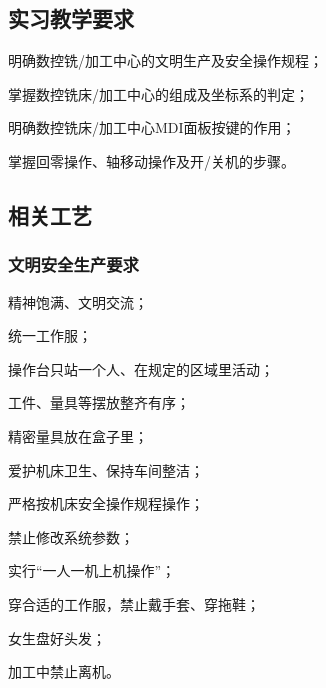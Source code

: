 \jxhj{%
}

\makeshouye%

\subsection{实习教学要求}
\begin{compactenum}[1、]
\item 明确数控铣/加工中心的文明生产及安全操作规程；
\item 掌握数控铣床/加工中心的组成及坐标系的判定；
\item 明确数控铣床/加工中心MDI面板按键的作用；
\item 掌握回零操作、轴移动操作及开/关机的步骤。
\end{compactenum}

\subsection{相关工艺}
\subsubsection{文明安全生产要求}
\begin{compactenum}[1、]
\item 精神饱满、文明交流；
\item 统一工作服；
\item 操作台只站一个人、在规定的区域里活动；
\item 工件、量具等摆放整齐有序；
\item 精密量具放在盒子里；
\item 爱护机床卫生、保持车间整洁；
\item 严格按机床安全操作规程操作；
\item 禁止修改系统参数；
\item 实行“一人一机上机操作”；
\item 穿合适的工作服，禁止戴手套、穿拖鞋；
\item 女生盘好头发；
\item 加工中禁止离机。
\end{compactenum}


